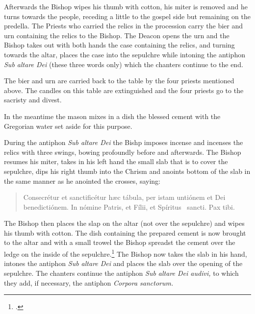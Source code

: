 \documentclass[letterpaper]{report}
\begin{document}
{\rubric Afterwards the Bishop wipes his thumb with cotton, his miter is removed
and he turns towards the people, receding a little to the gospel side but
remaining on the predella. The Priests who carried the relics in the procession
carry the bier and urn containing the relics to the Bishop. The Deacon opens
the urn and the Bishop takes out with both hands the case containing the
relics, and turning towards the altar, places the case into the sepulchre while
intoning the antiphon \textit{Sub altare Dei} (these three words only) which
the chanters continue to the end.

The bier and urn are carried back to the table by the four priests mentioned
above. The candles on this table are extinguished and the four priests go to
the sacristy and divest.

In the meantime the mason mixes in a dish the blessed cement with the Gregorian
water set aside for this purpose.

\rubric During the antiphon \textit{Sub altare Dei} the Bishp imposes incense
and incenses the relics with three swings, bowing profoundly before and
afterwards. The Bishop resumes his miter, takes in his left hand the small slab
that is to cover the sepulchre, dips his right thumb into the Chrism and
anoints bottom of the slab in the same manner as he anointed the crosses,
saying:

\begin{quote}
    Conse\cross crétur et sancti\cross ficétur h\ae c tábula, per istam
    untiónem et Dei benedictiónem. In nómine Pa\cross tris, et Fí\cross lii, et
    Spíritus \cross\ sancti. Pax tibi.
\end{quote}

\rubric The Bishop then places the slap on the altar (not over the sepulchre)
and wipes his thumb with cotton. The dish containing the prepared cement is now
brought to the altar and with a small trowel the Bishop spreadst the cement
over the ledge on the inside of the sepulchre.\footcite[The bishop may be
assisted by the mason, and care should be taken that the cement does not fall
on the sack containing the relics.][footnote 1, p. 89.]{consecranda} The Bishop
now takes the slab in his hand, intones the antiphon \textit{Sub altare Dei}
and places the slab over the opening of the sepulchre. The chanters continue
the antiphon \textit{Sub altare Dei audivi,} to which they add, if necessary,
the antiphon \textit{Corpora sanctorum.}

}
\end{document}
